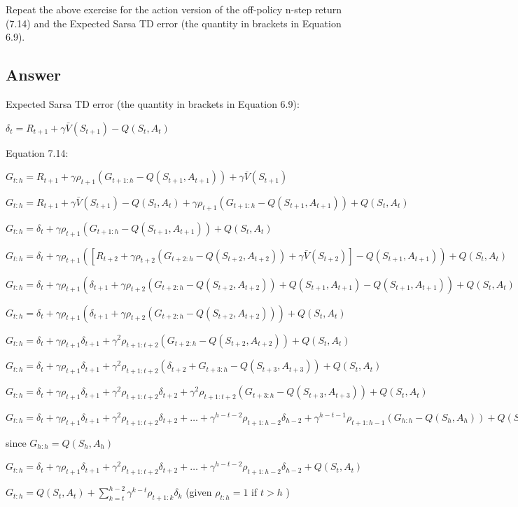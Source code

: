 \documentclass[11pt]{article}
\begin{document}
    Repeat the above exercise for the action version of the off-policy n-step return (7.14) and the Expected Sarsa TD error (the quantity in brackets in Equation 6.9).

    \subsection*{Answer}

    Expected Sarsa TD error (the quantity in brackets in Equation 6.9):

    \noindent $ \delta_{t} = R_{t+1} + \gamma \bar{V}(S_{t+1}) -Q(S_t,A_t) $

    \noindent Equation 7.14:

    \noindent $ G_{t:h} = R_{t+1} + \gamma \rho_{t+1} (G_{t+1:h} - Q(S_{t+1},A_{t+1} )) + \gamma \bar{V}(S_{t+1}) $

    \noindent $ G_{t:h} = R_{t+1} + \gamma \bar{V}(S_{t+1}) -Q(S_t,A_t) + \gamma \rho_{t+1} (G_{t+1:h} - Q(S_{t+1},A_{t+1} ))  + Q(S_t,A_t)  $

    \noindent $ G_{t:h} = \delta_{t} + \gamma \rho_{t+1} (G_{t+1:h} - Q(S_{t+1},A_{t+1} ))  + Q(S_t,A_t) $

    \noindent $ G_{t:h} = \delta_{t} + \gamma \rho_{t+1} ( [ R_{t+2} + \gamma \rho_{t+2} (G_{t+2:h} - Q(S_{t+2},A_{t+2} )) + \gamma \bar{V}(S_{t+2}) ] - Q(S_{t+1},A_{t+1} )) + Q(S_t,A_t)$

    \noindent $ G_{t:h} = \delta_{t} + \gamma \rho_{t+1} (  \delta_{t+1} + \gamma \rho_{t+2} (G_{t+2:h} - Q(S_{t+2},A_{t+2} )) + Q(S_{t+1},A_{t+1}) - Q(S_{t+1},A_{t+1}) ) + Q(S_t,A_t) $

    \noindent $ G_{t:h} = \delta_{t} + \gamma \rho_{t+1} (  \delta_{t+1} + \gamma \rho_{t+2} (G_{t+2:h} - Q(S_{t+2},A_{t+2} ))  ) + Q(S_t,A_t) $

    \noindent $ G_{t:h} = \delta_{t} + \gamma \rho_{t+1} \delta_{t+1} + \gamma^2 \rho_{t+1:t+2} ( G_{t+2:h} - Q(S_{t+2},A_{t+2} ))  + Q(S_t,A_t) $

    \noindent $ G_{t:h} = \delta_{t} + \gamma \rho_{t+1} \delta_{t+1} + \gamma^2 \rho_{t+1:t+2} ( \delta_{t+2} +  G_{t+3:h} - Q(S_{t+3},A_{t+3} )  )  + Q(S_t,A_t) $

    \noindent $ G_{t:h} = \delta_{t} + \gamma \rho_{t+1} \delta_{t+1} + \gamma^2 \rho_{t+1:t+2} \delta_{t+2} +  \gamma^2 \rho_{t+1:t+2} (G_{t+3:h} - Q(S_{t+3},A_{t+3} )  )   + Q(S_t,A_t) $

    \noindent $ G_{t:h} = \delta_{t} + \gamma \rho_{t+1} \delta_{t+1} + \gamma^2 \rho_{t+1:t+2} \delta_{t+2} + \dots + \gamma^{h-t-2} \rho_{t+1:h-2} \delta_{h-2} + \gamma^{h-t-1} \rho_{t+1:h-1} (G_{h:h} - Q(S_{h},A_{h} )  )  + Q(S_t,A_t) $

    \noindent since $ G_{h:h} = Q(S_h,A_h) $

    \noindent $ G_{t:h} = \delta_{t} + \gamma \rho_{t+1} \delta_{t+1} + \gamma^2 \rho_{t+1:t+2} \delta_{t+2} + \dots +  \gamma^{h-t-2} \rho_{t+1:h-2} \delta_{h-2} + Q(S_t,A_t) $

    \noindent $ G_{t:h} = Q(S_t,A_t) + \sum_{k=t}^{h-2} \gamma^{k-t} \rho_{t+1:k} \delta_k $ (given $ \rho_{t:h} = 1$ if $ t>h $ )
\end{document}
